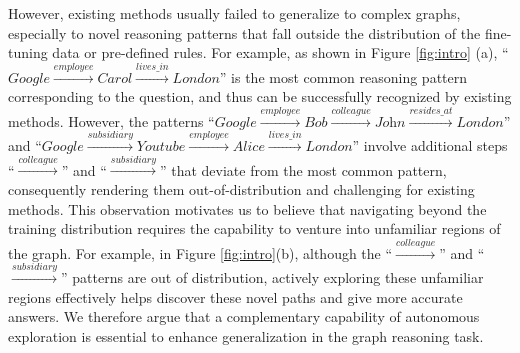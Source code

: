 However, existing methods usually failed to generalize to complex graphs, especially to novel reasoning patterns that fall outside the distribution of the fine-tuning data or pre-defined rules.
For example, as shown in Figure \ref{fig:intro} (a), ``$\textit{Google}\xrightarrow{\textit{employee}}\textit{Carol}\xrightarrow{\textit{lives\_in}}\textit{London}$'' is the most common reasoning pattern corresponding to the question, and thus can be successfully recognized by existing methods. However, the patterns ``$\textit{Google}\xrightarrow{\textit{employee}}\textit{Bob}\xrightarrow{\textit{colleague}}\textit{John}\xrightarrow{\textit{resides\_at}}\textit{London}$'' and ``$\textit{Google}\xrightarrow{\textit{subsidiary}}\textit{Youtube}\xrightarrow{\textit{employee}}\textit{Alice}\xrightarrow{\textit{lives\_in}}\textit{London}$'' involve additional steps ``$\xrightarrow{\textit{colleague}}$'' and ``$\xrightarrow{\textit{subsidiary}}$'' that deviate from the most common pattern, consequently rendering them out-of-distribution and challenging for existing methods.
This observation motivates us to believe that navigating beyond the training distribution requires the capability to venture into unfamiliar regions of the graph.
For example, in Figure \ref{fig:intro}(b), although the ``$\xrightarrow{\textit{colleague}}$'' and ``$\xrightarrow{\textit{subsidiary}}$'' patterns are out of distribution, actively exploring these unfamiliar regions effectively helps discover these novel paths and give more accurate answers.
We therefore argue that a complementary capability of autonomous exploration is essential to enhance generalization in the graph reasoning task.

